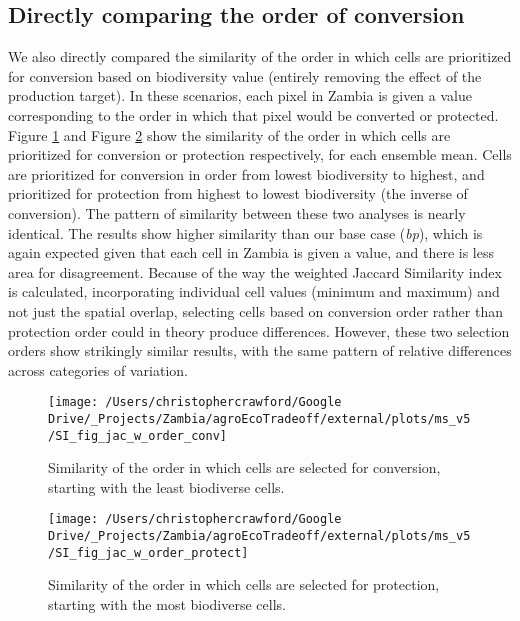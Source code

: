 \documentclass[
]{article}
\begin{document}
\newpage

\hypertarget{section-order}{%
\subsection{Directly comparing the order of conversion}\label{section-order}}

We also directly compared the similarity of the order in which cells are prioritized for conversion based on biodiversity value (entirely removing the effect of the production target). In these scenarios, each pixel in Zambia is given a value corresponding to the order in which that pixel would be converted or protected. Figure \ref{fig:order-conv} and Figure \ref{fig:order-protect} show the similarity of the order in which cells are prioritized for conversion or protection respectively, for each ensemble mean. Cells are prioritized for conversion in order from lowest biodiversity to highest, and prioritized for protection from highest to lowest biodiversity (the inverse of conversion). The pattern of similarity between these two analyses is nearly identical. The results show higher similarity than our base case (\emph{bp}), which is again expected given that each cell in Zambia is given a value, and there is less area for disagreement. Because of the way the weighted Jaccard Similarity index is calculated, incorporating individual cell values (minimum and maximum) and not just the spatial overlap, selecting cells based on conversion order rather than protection order could in theory produce differences. However, these two selection orders show strikingly similar results, with the same pattern of relative differences across categories of variation.





\begin{figure}
\texttt{[image: /Users/christophercrawford/Google Drive/\_Projects/Zambia/agroEcoTradeoff/external/plots/ms\_v5/SI\_fig\_jac\_w\_order\_conv]} \caption{Similarity of the order in which cells are selected for conversion, starting with the least biodiverse cells.}\label{fig:order-conv}
\end{figure}

\begin{figure}
\texttt{[image: /Users/christophercrawford/Google Drive/\_Projects/Zambia/agroEcoTradeoff/external/plots/ms\_v5/SI\_fig\_jac\_w\_order\_protect]} \caption{Similarity of the order in which cells are selected for protection, starting with the most biodiverse cells.}\label{fig:order-protect}
\end{figure}
\end{document}
